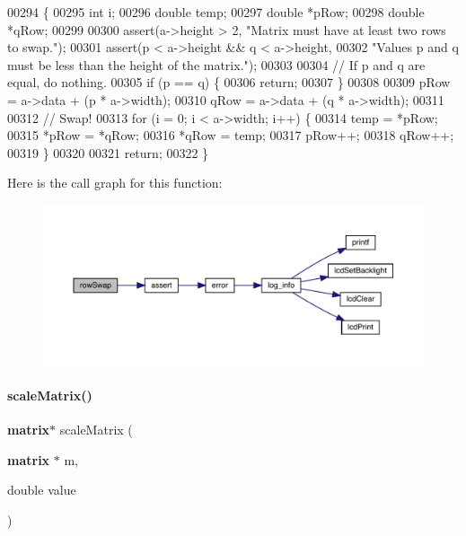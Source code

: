 \begin{DoxyCode}
00294                                       \{
00295   \textcolor{keywordtype}{int} i;
00296   \textcolor{keywordtype}{double} temp;
00297   \textcolor{keywordtype}{double} *pRow;
00298   \textcolor{keywordtype}{double} *qRow;
00299 
00300   assert(a->height > 2, \textcolor{stringliteral}{"Matrix must have at least two rows to swap."});
00301   assert(p < a->height && q < a->height,
00302          \textcolor{stringliteral}{"Values p and q must be less than the height of the matrix."});
00303 
00304   \textcolor{comment}{// If p and q are equal, do nothing.}
00305   \textcolor{keywordflow}{if} (p == q) \{
00306     \textcolor{keywordflow}{return};
00307   \}
00308 
00309   pRow = a->data + (p * a->width);
00310   qRow = a->data + (q * a->width);
00311 
00312   \textcolor{comment}{// Swap!}
00313   \textcolor{keywordflow}{for} (i = 0; i < a->width; i++) \{
00314     temp = *pRow;
00315     *pRow = *qRow;
00316     *qRow = temp;
00317     pRow++;
00318     qRow++;
00319   \}
00320 
00321   \textcolor{keywordflow}{return};
00322 \}
\end{DoxyCode}
Here is the call graph for this function\+:
\nopagebreak
\begin{figure}[H]
\begin{center}
\leavevmode
\includegraphics[width=350pt]{matrix_8h_acdd57777a972ce339153878fa917db14_cgraph}
\end{center}
\end{figure}
\mbox{\label{matrix_8h_a6b7faa6ba9ee987d0777d9d0bd0e7b32}} 
\paragraph{scale\+Matrix()}
{\footnotesize\ttfamily \textbf{ matrix}$\ast$ scale\+Matrix (\begin{DoxyParamCaption}\item[{\textbf{ matrix} $\ast$}]{m,  }\item[{double}]{value }\end{DoxyParamCaption})}



